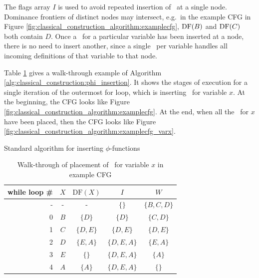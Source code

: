 The flags array $I$ is used to avoid repeated insertion of \phiops\
at a single node. Dominance
frontiers
of distinct nodes may intersect, e.g.\ in the example CFG in Figure
\ref{fig:classical_construction_algorithm:examplecfg},
$\mathrm{DF}(B)$ and $\mathrm{DF}(C)$ both contain $D$. 
Once a \phiop\ for a particular variable has been
inserted at a node,
there is no need to insert another, since a single \phiop\ per
variable handles all incoming definitions of that variable to that node.

Table \ref{table:classical_construction:walkthru} 
gives a walk-through example of Algorithm 
\ref{alg:classical_construction:phi_insertion}.
It shows the stages of execution for a single iteration of
the outermost for loop, which is inserting \phiops\
for variable $x$.
At the beginning, the CFG looks like Figure \ref{fig:classical_construction_algorithm:examplecfg}.
At the end, when all the \phiops\ for $x$ have
been placed, then the CFG looks like Figure \ref{fig:classical_construction_algorithm:examplecfg_varx}.

\begin{algorithm}
\caption{\label{alg:classical_construction:phi_insertion}Standard algorithm for inserting $\phi$-functions}
\end{algorithm}


\begin{table}
\begin{center}
\begin{tabular}{r|c|c|c|c}
\textbf{while loop \#} & $X$ & $\textrm{DF}(X)$ & $I$         & $W$\\ \hline
-                      & -   & -                & $\{\}$      & $\{B,C,D\}$ \\
0                      & $B$ & $\{D\}$          & $\{D\}$     & $\{C,D\}$ \\
1                      & $C$ & $\{D,E\}$        & $\{D,E\}$   & $\{D,E\}$ \\
2                      & $D$ & $\{E,A\}$        & $\{D,E,A\}$ & $\{E,A\}$\\
3                      & $E$ & $\{\}$           & $\{D,E,A\}$ & $\{A\}$\\
4                      & $A$ & $\{A\}$          & $\{D,E,A\}$ & $\{\}$\\ \hline
\end{tabular}
\end{center}
\caption{\label{table:classical_construction:walkthru}Walk-through of
  placement of \phiops\ for variable $x$ in example CFG}
\end{table}


